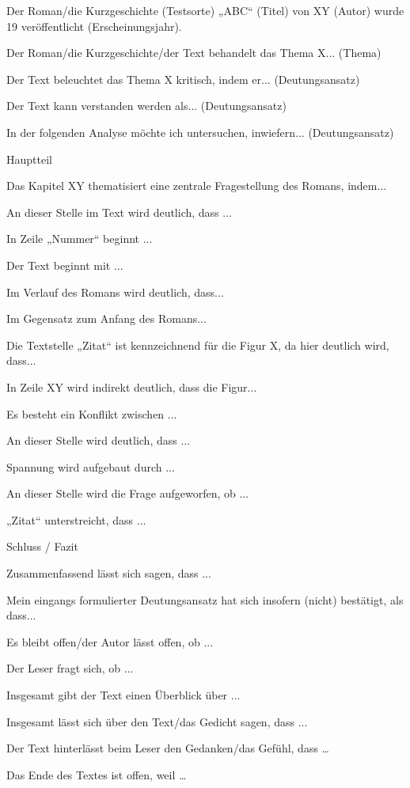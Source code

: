 \begin{compactitem}
    \item Der Roman/die Kurzgeschichte (Testsorte) „ABC“ (Titel) von XY (Autor) wurde 19 veröffentlicht (Erscheinungsjahr). 
    \item Der Roman/die Kurzgeschichte/der Text behandelt das Thema X... (Thema) 
    \item Der Text beleuchtet das Thema X kritisch, indem er... (Deutungsansatz) 
    \item Der Text kann verstanden werden als... (Deutungsansatz) 
    \item In der folgenden Analyse möchte ich untersuchen, inwiefern... (Deutungsansatz)
\end{compactitem}
Hauptteil
\begin{compactitem}
    \item Das Kapitel XY thematisiert eine zentrale Fragestellung des Romans, indem... 
    \item An dieser Stelle im Text wird deutlich, dass ... 
    \item In Zeile „Nummer“ beginnt ... 
    \item Der Text beginnt mit ... 
    \item  Im Verlauf des Romans wird deutlich, dass... 
    \item Im Gegensatz zum Anfang des Romans... 
    \item  Die Textstelle „Zitat“ ist kennzeichnend für die Figur X, da hier deutlich wird, dass... 
    \item In Zeile XY wird indirekt deutlich, dass die Figur... 
    \item Es besteht ein Konflikt zwischen ... 
    \item An dieser Stelle wird deutlich, dass ... 
    \item Spannung wird aufgebaut durch ... 
    \item An dieser Stelle wird die Frage aufgeworfen, ob ... 
    \item „Zitat“ unterstreicht, dass ... 
\end{compactitem}
Schluss / Fazit
\begin{compactitem}
    \item Zusammenfassend lässt sich sagen, dass ... 
    \item  Mein eingangs formulierter Deutungsansatz hat sich insofern (nicht) bestätigt, als dass... 
    \item Es bleibt offen/der Autor lässt offen, ob ... 
    \item Der Leser fragt sich, ob ... 
    \item Insgesamt gibt der Text einen Überblick über ... 
    \item Insgesamt lässt sich über den Text/das Gedicht sagen, dass ... 
    \item Der Text hinterlässt beim Leser den Gedanken/das Gefühl, dass … 
    \item  Das Ende des Textes ist offen, weil … 
\end{compactitem}


